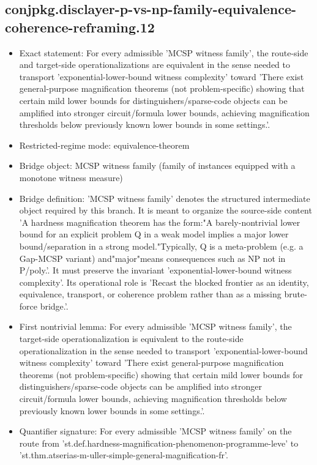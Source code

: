 \documentclass[11pt]{article}
\begin{document}
\subsection*{conjpkg.disclayer-p-vs-np-family-equivalence-coherence-reframing.12}
\begin{itemize}
\item Exact statement: For every admissible 'MCSP witness family', the route-side and target-side operationalizations are equivalent in the sense needed to transport 'exponential-lower-bound witness complexity' toward 'There exist general-purpose magnification theorems (not problem-specific) showing that certain mild lower bounds for distinguishers/sparse-code objects can be amplified into stronger circuit/formula lower bounds, achieving magnification thresholds below previously known lower bounds in some settings.'.
\item Restricted-regime mode: equivalence-theorem
\item Bridge object: MCSP witness family (family of instances equipped with a monotone witness measure)
\item Bridge definition: 'MCSP witness family' denotes the structured intermediate object required by this branch. It is meant to organize the source-side content 'A hardness magnification theorem has the form:"A barely-nontrivial lower bound for an explicit problem Q in a weak model implies a major lower bound/separation in a strong model."Typically, Q is a meta-problem (e.g. a Gap-MCSP variant) and"major"means consequences such as NP not in P/poly.'. It must preserve the invariant 'exponential-lower-bound witness complexity'. Its operational role is 'Recast the blocked frontier as an identity, equivalence, transport, or coherence problem rather than as a missing brute-force bridge.'.
\item First nontrivial lemma: For every admissible 'MCSP witness family', the target-side operationalization is equivalent to the route-side operationalization in the sense needed to transport 'exponential-lower-bound witness complexity' toward 'There exist general-purpose magnification theorems (not problem-specific) showing that certain mild lower bounds for distinguishers/sparse-code objects can be amplified into stronger circuit/formula lower bounds, achieving magnification thresholds below previously known lower bounds in some settings.'.
\item Quantifier signature: For every admissible 'MCSP witness family' on the route from 'st.def.hardness-magnification-phenomenon-programme-leve' to 'st.thm.atserias-m-uller-simple-general-magnification-fr'.

\end{itemize}
\end{document}
